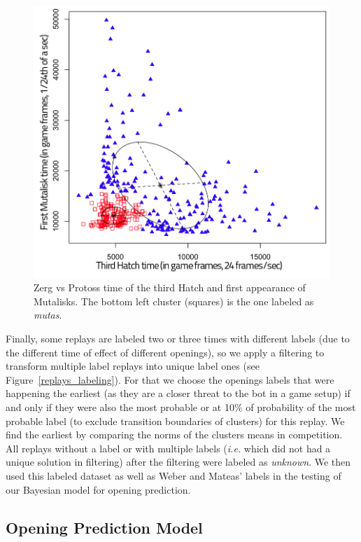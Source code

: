 \begin{figure}[htp]
\centerline{\includegraphics[width=0.9\columnwidth]{images/ZvPmutas.png}}
\vspace{-0.5cm}
\caption{Zerg vs Protoss time of the third Hatch and first appearance of Mutalisks. The bottom left cluster (squares) is the one labeled as \textit{mutas}.}
\label{ZvPmutas}
\end{figure}

Finally, some replays are labeled two or three times with different labels (due to the different time of effect of different openings), so we apply a filtering to transform multiple label replays into unique label ones (see Figure~\ref{replays_labeling}). For that we choose the openings labels that were happening the earliest (as they are a closer threat to the bot in a game setup) if and only if they were also the most probable or at 10\% of probability of the most probable label (to exclude transition boundaries of clusters) for this replay. We find the earliest by comparing the norms of the clusters means in competition. All replays without a label or with multiple labels (\textit{i.e.} which did not had a unique solution in filtering) after the filtering were labeled as \textit{unknown}. We then used this labeled dataset as well as Weber and Mateas' labels in the testing of our Bayesian model for opening prediction.

\subsection{Opening Prediction Model}

